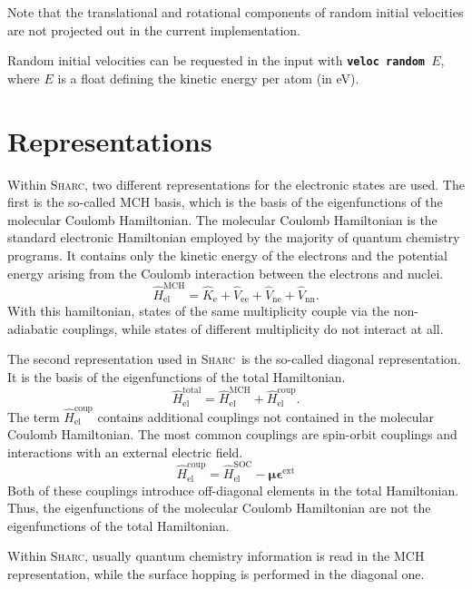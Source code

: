 \documentclass[a4paper,11pt,DIV=15,openany,twoside=false]{scrbook}
\newcommand{\sharc}{\textsc{Sharc}}
\newcommand{\ttt}[1]{\textbf{\texttt{#1}}}
\begin{document}
Note that the translational and rotational components of random initial velocities are not projected out in the current implementation.

Random initial velocities can be requested in the input with \ttt{veloc random $E$}, where $E$ is a float defining the kinetic energy per atom (in eV).


\section{Representations}

Within \sharc, two different representations for the electronic states are used. The first is the so-called MCH basis, which is the basis of the eigenfunctions of the molecular Coulomb Hamiltonian. The molecular Coulomb Hamiltonian is the standard electronic Hamiltonian employed by the majority of quantum chemistry programs. It contains only the kinetic energy of the electrons and the potential energy arising from the Coulomb interaction between the electrons and nuclei.
\begin{equation}
  \hat{H}_{\text{el}}^{\text{MCH}}
  =\hat{K}_{\text{e}}
  +\hat{V}_{\text{ee}}
  +\hat{V}_{\text{ne}}
  +\hat{V}_{\text{nn}}.
\end{equation}
With this hamiltonian, states of the same multiplicity couple via the non-adiabatic couplings, while states of different multiplicity do not interact at all. 

The second representation used in \sharc\ is the so-called diagonal representation. It is the basis of the eigenfunctions of the total Hamiltonian.
\begin{equation}
  \hat{H}_{\text{el}}^{\text{total}}
  =\hat{H}_{\text{el}}^{\text{MCH}}
  +\hat{H}_{\text{el}}^{\text{coup}}.
\end{equation}
The term $\hat{H}_{\text{el}}^{\text{coup}}$ contains additional couplings not contained in the molecular Coulomb Hamiltonian. The most common couplings are spin-orbit couplings and interactions with an external electric field.
\begin{equation}
  \hat{H}_{\text{el}}^{\text{coup}}=\hat{H}_{\text{el}}^{\text{SOC}}-\boldsymbol{\mu}\boldsymbol{\epsilon}^{\text{ext}}
\end{equation}
Both of these couplings introduce off-diagonal elements in the total Hamiltonian. Thus, the eigenfunctions of the molecular Coulomb Hamiltonian are not the eigenfunctions of the total Hamiltonian. 

Within \sharc, usually quantum chemistry information is read in the MCH representation, while the surface hopping is performed in the diagonal one.
\end{document}
